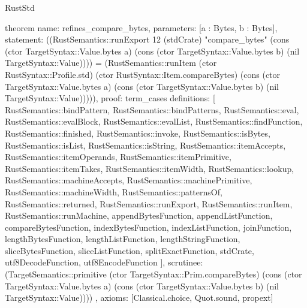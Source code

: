 \begin{lexlean}{RustStd}
\begin{semanticmodule}
theorem{
  name: refines_compare_bytes,
  parameters: [a : Bytes, b : Bytes],
  statement: ((RustSemantics::runExport 12 (stdCrate) "compare_bytes" (cons (ctor TargetSyntax::Value.bytes a) (cons (ctor TargetSyntax::Value.bytes b) (nil TargetSyntax::Value)))) = (RustSemantics::runItem (ctor RustSyntax::Profile.std) (ctor RustSyntax::Item.compareBytes) (cons (ctor TargetSyntax::Value.bytes a) (cons (ctor TargetSyntax::Value.bytes b) (nil TargetSyntax::Value))))),
  proof: term_cases{
    definitions: [
      RustSemantics::bindPattern,
      RustSemantics::bindPatterns,
      RustSemantics::eval,
      RustSemantics::evalBlock,
      RustSemantics::evalList,
      RustSemantics::findFunction,
      RustSemantics::finished,
      RustSemantics::invoke,
      RustSemantics::isBytes,
      RustSemantics::isList,
      RustSemantics::isString,
      RustSemantics::itemAccepts,
      RustSemantics::itemOperands,
      RustSemantics::itemPrimitive,
      RustSemantics::itemTakes,
      RustSemantics::itemWidth,
      RustSemantics::lookup,
      RustSemantics::machineAccepts,
      RustSemantics::machinePrimitive,
      RustSemantics::machineWidth,
      RustSemantics::patternsOf,
      RustSemantics::returned,
      RustSemantics::runExport,
      RustSemantics::runItem,
      RustSemantics::runMachine,
      appendBytesFunction,
      appendListFunction,
      compareBytesFunction,
      indexBytesFunction,
      indexListFunction,
      joinFunction,
      lengthBytesFunction,
      lengthListFunction,
      lengthStringFunction,
      sliceBytesFunction,
      sliceListFunction,
      splitExactFunction,
      stdCrate,
      utf8DecodeFunction,
      utf8EncodeFunction
    ],
    scrutinee: (TargetSemantics::primitive (ctor TargetSyntax::Prim.compareBytes) (cons (ctor TargetSyntax::Value.bytes a) (cons (ctor TargetSyntax::Value.bytes b) (nil TargetSyntax::Value))))
  },
  axioms: [Classical.choice, Quot.sound, propext]
}


\end{semanticmodule}
\end{lexlean}
